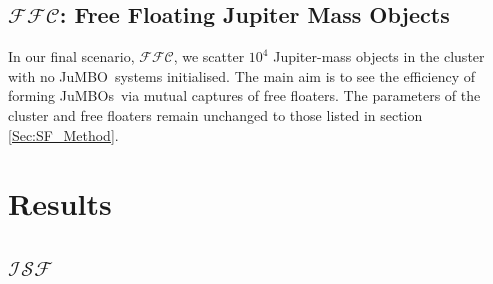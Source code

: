 \documentclass[aa]{lib/aa}
\newcommand{\jumbo}{\mbox{JuMBO}}
\newcommand{\jumbos}{\mbox{JuMBOs}}
\begin{document}
    \subsection{$\mathcal{FFC}$: Free Floating Jupiter Mass Objects}
    In our final scenario, $\mathcal{FFC}$, we scatter $10^{4}$ Jupiter-mass objects in the cluster with no \jumbo\, systems initialised. The main aim is to see the efficiency of forming \jumbos\, via mutual captures of free floaters. The parameters of the cluster and free floaters remain unchanged to those listed in section \ref{Sec:SF_Method}.

\section{Results}
\subsection{$\mathcal{ISF}$}
\end{document}
